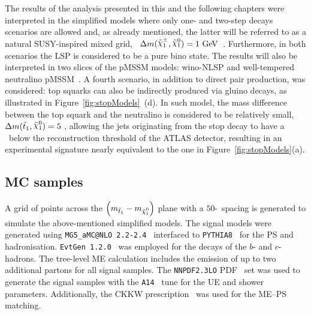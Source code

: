 
			The results of the analysis presented in this and the following chapters were interpreted in the simplified models where only one- and two-step decays scenarios are allowed and, as already mentioned, the latter will be referred to as a natural \ac{SUSY}-inspired mixed grid, \ie\ $\Delta m(\chinoonepm, \ninoone) = 1 \GeV$~\cite{Alwall:2008ve,Alwall:2008ag,Alves:2011wf}. Furthermore, in both scenarios the \ac{LSP} is considered to be a pure bino state. The results will also be interpreted in two slices of the \ac{pMSSM} models: wino-\ac{NLSP} and well-tempered neutralino \ac{pMSSM}~\cite{Djouadi:1998di,Berger:2008cq}.
			A fourth scenario, in addition to direct pair production, was considered: top squarks can also be indirectly produced via gluino decays, as illustrated in Figure~\ref{fig:stopModels}~(d). In such model, the mass difference between the top squark and the neutralino is considered to be relatively small, $\Delta m(\stopone, \ninoone) = 5$ \GeV, allowing the jets originating from the stop decay to have a \pt\ below the reconstruction threshold of the \ac{ATLAS} detector, resulting in an experimental signature nearly equivalent to the one in Figure~\ref{fig:stopModels}(a).


		\subsection{MC samples}

			A grid of points across the $\left(\mstopone-\mninoone\right)$ plane with a $50$-\GeV\ spacing is generated to simulate the above-mentioned simplified models. %
			The signal models were generated using \texttt{MG5\_aMC@NLO 2.2-2.4}~\cite{madgraph} interfaced to \texttt{PYTHIA8}~\cite{pythia8} for the \ac{PS} and hadronisation. \texttt{EvtGen 1.2.0}~\cite{evtGen} was employed for the decays of the  $b$- and $c$-hadrons. The tree-level \ac{ME} calculation includes the emission of up to two additional partons for all signal samples. The \texttt{NNPDF2.3LO} \ac{PDF}~\cite{PDFs} set was used to generate the signal samples with the \verb+A14+~\cite{CT10} tune for the \ac{UE} and shower parameters. Additionally, the \ac{CKKW} prescription~\cite{CKKW} was used for the \ac{ME}–\ac{PS} matching. 

